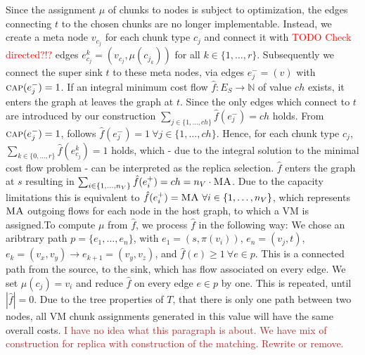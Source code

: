 \documentclass[9pt,twocolumn]{scrartcl}
\newcommand{\Capacity}{\ensuremath{\textsc{cap}}}
\newcommand{\carlo}[1]{\textcolor{red}{#1}}
\newcommand{\maciek}[1]{\textcolor{brown}{#1}}
\newcommand{\MaFactor}{\ensuremath{\textsc{MA}}}
\newcommand{\Path}{\ensuremath{p}}
\newcommand{\RedundancyFactor}{\ensuremath{r}}
\newcommand{\Source}{\ensuremath{s}}
\newcommand{\Sink}{\ensuremath{t}}
\newcommand{\VmChunkAssignment}{\mu}
\newcommand{\NodeMapping}{\pi}
\newcommand{\VirtualNode}{v}
\newcommand{\SubstrateEdges}{\ensuremath{E_S}}
\newcommand{\SubstrateNode}{\ensuremath{v}}
\newcommand{\SubstrateEdge}{\ensuremath{e}}
\newcommand{\achunk}{\ensuremath{c}}
\newcommand{\Tree}{\ensuremath{T}}
\newcommand{\Vms}{\ensuremath{n_V}}
\newcommand{\ChunkTypes}{\ensuremath{ch}}
\begin{document}
Since the assignment $\VmChunkAssignment$ of chunks to nodes 
is subject to optimization, the edges connecting $\Sink$ to the
chosen chunks are no longer implementable. Instead, we create a meta node
$\SubstrateNode_{\achunk_j}$ for each chunk type
$\achunk_j$ and connect it with \carlo{TODO Check directed?!?} edges
$\SubstrateEdge_{\achunk_j}^k = (\SubstrateNode_{\achunk_j},
\VmChunkAssignment(\achunk_{j_k}))$ for all $k \in
\{1,\dots,\RedundancyFactor\}$. Subsequently we connect the super sink
$\Sink$ to these meta nodes, via
edges $\SubstrateEdge_j^- = (\SubstrateNode)$ with
$\Capacity(\SubstrateEdge_j^-) = 1$. If an integral minimum cost flow $\hat f
: \SubstrateEdges \rightarrow \mathbb{N}$ of value $\ChunkTypes$ exists, it
enters the graph at leaves the graph at $\Sink$. Since the only
edges which connect to $\Sink$ are introduced by our construction $\sum_{j\in
\{1,\dots,\ChunkTypes\}} \hat f(\SubstrateEdge_j^-) = \ChunkTypes$ holds. From
$\Capacity(\SubstrateEdge_j^-) = 1$, follows $\hat f(\SubstrateEdge_j^-) = 1 ~
\forall j \in \{1,\dots, \ChunkTypes\}$. Hence, for each chunk type $\achunk_j$,
$\sum_{k \in \{0,\dots,\RedundancyFactor\}}\hat f(\SubstrateEdge_{c_j}^k) = 1$
holds, which - due to the integral solution to the minimal cost flow problem -
can be interpreted as the replica selection. $\hat f$ enters the graph at
$\Source$ resulting in $\sum_{i \in \{1,\dots,\Vms\}}\hat f(\SubstrateEdge_i^+)
= \ChunkTypes = \Vms \cdot \MaFactor$. Due to the capacity limitations this is
equivalent to $\hat f(\SubstrateEdge_i^+) = \MaFactor ~ \forall i \in
\{1,\dots, \Vms\}$, which represents $\MaFactor$ outgoing flows for each node
in the host graph, to which a VM is assigned.To compute $\VmChunkAssignment$ from $\hat f$, we process $\hat f$ in the
following way: We chose an aribtrary path $\Path =
\{\SubstrateEdge_{1}, \dots, \SubstrateEdge_{n}\}$, with $\SubstrateEdge_{1} =
(\Source, \NodeMapping(\VirtualNode_i))$, $\SubstrateEdge_{n} =
(\SubstrateNode_j, \Sink)$, $\SubstrateEdge_k= (\SubstrateNode_x,
\SubstrateNode_y) \rightarrow \SubstrateEdge_{k+1} = (\SubstrateNode_y,
\SubstrateNode_z)$, and $\hat f(\SubstrateEdge)\geq 1 ~ \forall \SubstrateEdge
\in \Path$. This is a connected path from the source, to the sink, which has
flow associated on every edge. We set $\VmChunkAssignment(\achunk_j) =
\VirtualNode_i$ and reduce $\hat f$ on every edge $\SubstrateEdge \in \Path$ by
one. This is repeated, until $|\hat f| = 0$. Due to the tree properties of
$\Tree$, that there is only one path between two nodes, all VM chunk
assignments generated in this value will have the same overall costs.
 \maciek{I have no idea what this paragraph is about. We have mix of construction for replica with construction of the matching. Rewrite or remove.}
\end{document}
